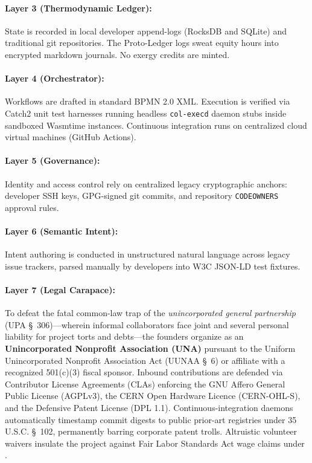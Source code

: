 \paragraph{Layer 3 (Thermodynamic Ledger):} State is recorded in local developer append-logs (RocksDB and SQLite) and traditional git repositories. The Proto-Ledger logs sweat equity hours into encrypted markdown journals. No exergy credits are minted.
\paragraph{Layer 4 (Orchestrator):} Workflows are drafted in standard BPMN 2.0 XML. Execution is verified via Catch2 unit test harnesses running headless \texttt{col-execd} daemon stubs inside sandboxed Wasmtime instances. Continuous integration runs on centralized cloud virtual machines (GitHub Actions).
\paragraph{Layer 5 (Governance):} Identity and access control rely on centralized legacy cryptographic anchors: developer SSH keys, GPG-signed git commits, and repository \texttt{CODEOWNERS} approval rules.
\paragraph{Layer 6 (Semantic Intent):} Intent authoring is conducted in unstructured natural language across legacy issue trackers, parsed manually by developers into W3C JSON-LD test fixtures.
\paragraph{Layer 7 (Legal Carapace):} To defeat the fatal common-law trap of the \textit{unincorporated general partnership} (UPA \S~306)---wherein informal collaborators face joint and several personal liability for project torts and debts---the founders organize as an \textbf{Unincorporated Nonprofit Association (UNA)} pursuant to the Uniform Unincorporated Nonprofit Association Act (UUNAA \S~6) or affiliate with a recognized 501(c)(3) fiscal sponsor. Inbound contributions are defended via Contributor License Agreements (CLAs) enforcing the GNU Affero General Public License (AGPLv3), the CERN Open Hardware Licence (CERN-OHL-S), and the Defensive Patent License (DPL 1.1). Continuous-integration daemons automatically timestamp commit digests to public prior-art registries under 35 U.S.C. \S~102, permanently barring corporate patent trolls. Altruistic volunteer waivers insulate the project against Fair Labor Standards Act wage claims under \textcite{alamo1985}.
